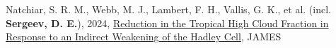 \item[\small{\highlightdark{\textbf{\textbullet}}}] 
\item[\small{\highlightdark{\textbf{\textbullet}}}] Natchiar, S. R. M., Webb, M. J., Lambert, F. H., Vallis, G. K., et al. (incl. \textbf{Sergeev, D. E.}), 2024, \href{https://doi.org/10.1029/2023MS003985}{Reduction in the Tropical High Cloud Fraction in Response to an Indirect Weakening of the Hadley Cell}, JAMES